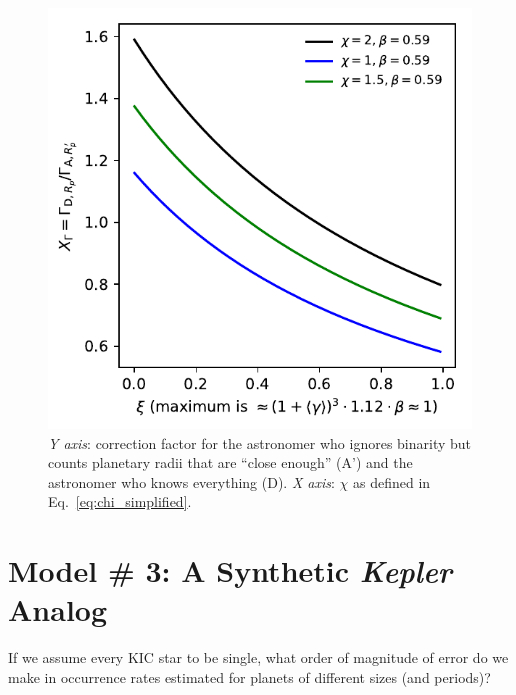 \documentclass{emulateapj}
\begin{document}
\begin{figure}[!t]
	\begin{center}
		\includegraphics[scale=.8]{figures/XGamma_vs_xi.pdf}
	\end{center}
	\caption{\textit{Y axis}: correction factor for the astronomer who 
	ignores binarity but counts planetary radii that are ``close enough'' (A') 
	and the astronomer who knows everything (D).
	\textit{X axis}: $\chi$ as defined in Eq.~\ref{eq:chi_simplified}.
	}
	\label{fig:XGamma_vs_xi}
\end{figure}



\section{Model \# 3: A Synthetic {\it Kepler} Analog}
\label{sec:model_3}

If we assume every KIC star to be single, what order of magnitude of error do 
we make in occurrence rates estimated for planets of different sizes (and 
periods)?
\end{document}
